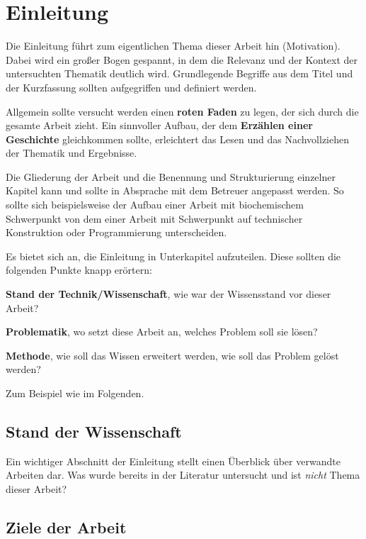 
\chapter{Einleitung}

Die Einleitung führt zum eigentlichen Thema dieser Arbeit hin (Motivation). Dabei wird ein großer Bogen gespannt, in dem die Relevanz und der Kontext der untersuchten Thematik deutlich wird. Grundlegende Begriffe aus dem Titel und der Kurzfassung sollten aufgegriffen und definiert werden.

Allgemein sollte versucht werden einen \textbf{roten Faden} zu legen, der sich durch die gesamte Arbeit zieht. Ein sinnvoller Aufbau, der dem \textbf{Erzählen einer Geschichte} gleichkommen sollte, erleichtert das Lesen und das Nachvollziehen der Thematik und Ergebnisse.

Die Gliederung der Arbeit und die Benennung und Strukturierung einzelner Kapitel kann und sollte in Absprache mit dem Betreuer angepasst werden. So sollte sich beispielsweise der Aufbau einer Arbeit mit biochemischem Schwerpunkt von dem einer Arbeit mit Schwerpunkt auf technischer Konstruktion oder Programmierung unterscheiden.

Es bietet sich an, die Einleitung in Unterkapitel aufzuteilen. Diese sollten die folgenden Punkte knapp erörtern:

\begin{description}
	\item \textbf{Stand der Technik/Wissenschaft}, wie war der Wissensstand vor dieser Arbeit?
	\item \textbf{Problematik}, wo setzt diese Arbeit an, welches Problem soll sie lösen?
	\item \textbf{Methode}, wie soll das Wissen erweitert werden, wie soll das Problem gelöst werden?
\end{description}

Zum Beispiel wie im Folgenden.

\section{Stand der Wissenschaft}

Ein wichtiger Abschnitt der Einleitung stellt einen Überblick über verwandte Arbeiten dar. Was wurde bereits in der Literatur untersucht und ist \emph{nicht} Thema dieser Arbeit?

\section{Ziele der Arbeit}

